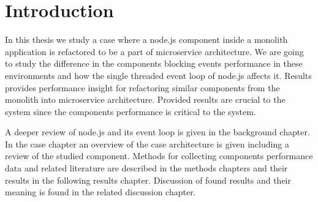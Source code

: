 \chapter{Introduction\label{intro}}
In this thesis we study a case where a node.js component inside a monolith application is refactored to be a part of microservice architecture.
We are going to study the difference in the components blocking events performance in these environments and how the single threaded event loop of node.js affects it.
Results provides performance insight for refactoring similar components from the monolith into microservice architecture.
Provided results are crucial to the system since the components performance is critical to the system.

A deeper review of node.js and its event loop is given in the background chapter.
In the case chapter an overview of the case architecture is given including a review of the studied component.
Methods for collecting components performance data and related literature are described in the methods chapters and their results in the following results chapter.
Discussion of found results and their meaning is found in the related discussion chapter.

